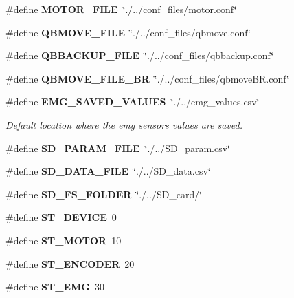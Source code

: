 \begin{DoxyCompactItemize}
\#define {\bfseries M\+O\+T\+O\+R\+\_\+\+F\+I\+LE}~\char`\"{}./../conf\+\_\+files/motor.\+conf\char`\"{}
\item 
\mbox{\label{definitions_8h_a85af9928ee1b7b3029d40a0058e617de}} 
\#define {\bfseries Q\+B\+M\+O\+V\+E\+\_\+\+F\+I\+LE}~\char`\"{}./../conf\+\_\+files/qbmove.\+conf\char`\"{}
\item 
\mbox{\label{definitions_8h_ad0c21fc604bc4dae8a306f330762b8b5}} 
\#define {\bfseries Q\+B\+B\+A\+C\+K\+U\+P\+\_\+\+F\+I\+LE}~\char`\"{}./../conf\+\_\+files/qbbackup.\+conf\char`\"{}
\item 
\mbox{\label{definitions_8h_a73d175f1cc3a063336277351cf7feb42}} 
\#define {\bfseries Q\+B\+M\+O\+V\+E\+\_\+\+F\+I\+L\+E\+\_\+\+BR}~\char`\"{}./../conf\+\_\+files/qbmove\+B\+R.\+conf\char`\"{}
\item 
\mbox{\label{definitions_8h_ab1563f614ecc2b82f97cd65b88217bd9}} 
\#define \textbf{ E\+M\+G\+\_\+\+S\+A\+V\+E\+D\+\_\+\+V\+A\+L\+U\+ES}~\char`\"{}./../emg\+\_\+values.\+csv\char`\"{}
\begin{DoxyCompactList}\small\item\em Default location where the emg sensors values are saved. \end{DoxyCompactList}\item 
\mbox{\label{definitions_8h_a2513ef83a48e5c1877ba58db6b6326d6}} 
\#define {\bfseries S\+D\+\_\+\+P\+A\+R\+A\+M\+\_\+\+F\+I\+LE}~\char`\"{}./../S\+D\+\_\+param.\+csv\char`\"{}
\item 
\mbox{\label{definitions_8h_a95bdc203708a970d7dd52ecf7b2f3814}} 
\#define {\bfseries S\+D\+\_\+\+D\+A\+T\+A\+\_\+\+F\+I\+LE}~\char`\"{}./../S\+D\+\_\+data.\+csv\char`\"{}
\item 
\mbox{\label{definitions_8h_a147e78b367bb63c90e08cdaf5eb0b3bf}} 
\#define {\bfseries S\+D\+\_\+\+F\+S\+\_\+\+F\+O\+L\+D\+ER}~\char`\"{}./../S\+D\+\_\+card/\char`\"{}
\item 
\mbox{\label{definitions_8h_a5f8f4a24628c7191c9adde97ae751bf2}} 
\#define {\bfseries S\+T\+\_\+\+D\+E\+V\+I\+CE}~0
\item 
\mbox{\label{definitions_8h_a911881bfa4a82a79f351f7a8a8ea40d1}} 
\#define {\bfseries S\+T\+\_\+\+M\+O\+T\+OR}~10
\item 
\mbox{\label{definitions_8h_a642639720f787f90dab85f94d4be660c}} 
\#define {\bfseries S\+T\+\_\+\+E\+N\+C\+O\+D\+ER}~20
\item 
\mbox{\label{definitions_8h_afca454140c3233621eaa719a25a1c4b5}} 
\#define {\bfseries S\+T\+\_\+\+E\+MG}~30
\item 

\end{DoxyCompactItemize}
